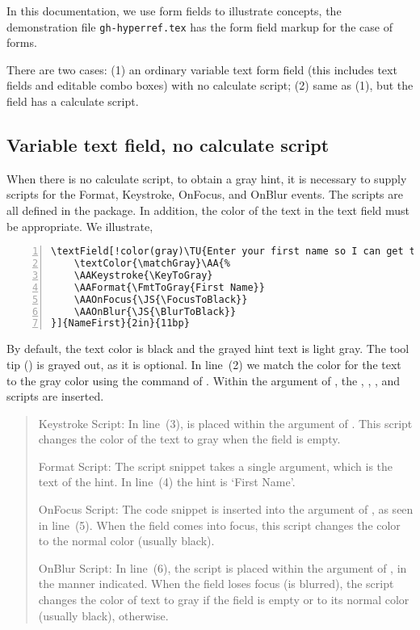 \documentclass{article}
\begin{document}
In this documentation, we use  form fields to illustrate concepts, the demonstration file
\texttt{gh-hyperref.tex} has the form field markup for the case of  forms.

There are two cases: (1) an ordinary variable text form field (this includes
text fields and editable combo boxes) with no calculate script; (2) same as
(1), but the field has a calculate script.

\subsection{Variable text field, no calculate script}

When there is no calculate script, to obtain a gray hint, it is necessary to
supply scripts for the Format, Keystroke, OnFocus, and OnBlur events. The
scripts are all defined in the  package. In addition, the
color of the text in the text field must be appropriate. We illustrate,
\begin{Verbatim}[xleftmargin=\parindent,commandchars=!(),numbers=left,numbersep=3bp,fontsize=\small]
\textField[!color(gray)\TU{Enter your first name so I can get to know you better}
    \textColor{\matchGray}\AA{%
    \AAKeystroke{\KeyToGray}
    \AAFormat{\FmtToGray{First Name}}
    \AAOnFocus{\JS{\FocusToBlack}}
    \AAOnBlur{\JS{\BlurToBlack}}
}]{NameFirst}{2in}{11bp}
\end{Verbatim}
By default, the text color is black and the grayed hint text is light gray.
The tool tip () is grayed out, as it is optional. In line~(2) we match
the color for the text to the gray color using the command  of
. Within the argument of , the ,
, , and  scripts are inserted.
\begin{quote}
\begin{description}
    \item{Keystroke Script:} In line~(3),  is placed within
        the argument of . This script changes the color
        of the text to gray when the field is empty.
    \item{Format Script:} The script snippet  takes a
        single argument, which is the text of the hint. In line~(4)
        the hint is `First Name'.
    \item{OnFocus Script:} The code snippet  is inserted
        into the argument of , as seen in line~(5). When the
        field comes into focus, this script changes the color to the
        normal color (usually black).
    \item{OnBlur Script:} In line~(6), the  script is
        placed within the argument of , in the manner
        indicated. When the field loses focus (is blurred), the script
        changes the color of text to gray if the field is empty or to
        its normal color (usually black), otherwise.
\end{description}
\end{quote}
\end{document}
